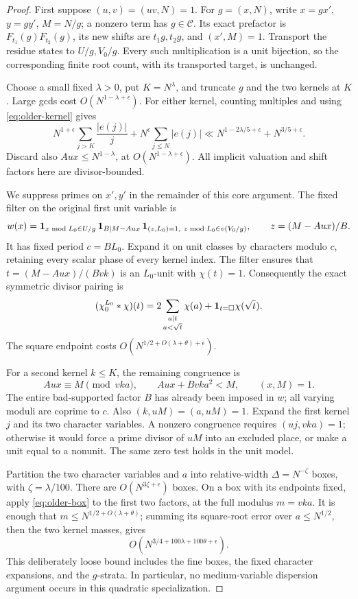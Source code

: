 \begin{proof}
First suppose \((u,v)=(uv,N)=1\).
For \(g=(x,N)\), write \(x=gx'\), \(y=gy'\), \(M=N/g\);
a nonzero term has \(g\in\mathcal C\).
Its exact prefactor is \(F_{t_1}(g)F_{t_2}(g)\), its new shifts
are \(t_1g,t_2g\), and \((x',M)=1\).
Transport the residue states to \(U/g,V_0/g\).
Every such multiplication is a unit bijection, so the corresponding
finite root count, with its transported target, is unchanged.

Choose a small fixed \(\lambda>0\), put \(K=N^\lambda\), and truncate
\(g\) and the two kernels at \(K\).
Large gcds cost \(O(N^{1-\lambda+\epsilon})\).
For either kernel, counting multiples and using
\eqref{eq:older-kernel} gives
\[
 N^{1+\epsilon}\sum_{j>K}\frac{|e(j)|}{j}
   +N^\epsilon\sum_{j\le N}|e(j)|
       \ll N^{1-2\lambda/5+\epsilon}+N^{3/5+\epsilon}.
\]
Discard also \(Au x\le N^{1-\lambda}\), at
\(O(N^{1-\lambda+\epsilon})\).
All implicit valuation and shift factors here are divisor-bounded.

We suppress primes on \(x',y'\) in the remainder of this core argument.
The fixed filter on the original first unit variable is
\[
 w(x)=\mathbf 1_{x\bmod L_0\in U/g}\,
       \mathbf 1_{B\mid M-Au x}\,
       \mathbf 1_{(z,L_0)=1,\ z\bmod L_0\in v(V_0/g)},\qquad
                       z=(M-Au x)/B.
\]
It has fixed period \(c=BL_0\).  Expand it on unit classes by characters
modulo \(c\), retaining every scalar phase of every kernel index.
The filter ensures that
\(t=(M-Au x)/(Bvk)\) is an \(L_0\)-unit with \(\chi(t)=1\).
Consequently the exact symmetric divisor pairing is
\[
 (\chi_0^{L_0}*\chi)(t)
  =2\sum_{\substack{a\mid t\\a<\sqrt t}}\chi(a)
                         +\mathbf 1_{t=\square}\chi(\sqrt t).
\]
The square endpoint costs \(O(N^{1/2+O(\lambda+\theta)+\epsilon})\).

For a second kernel \(k\le K\), the remaining congruence is
\[
       Au x\equiv M\pmod{vka},\qquad
       Au x+Bvka^2<M,\qquad (x,M)=1 .
\]
The entire bad-supported factor \(B\) has already been imposed in
\(w\); all varying moduli are coprime to \(c\).
Also \((k,uM)=(a,uM)=1\).
Expand the first kernel \(j\) and its two character variables.
A nonzero congruence requires \((uj,vka)=1\); otherwise it would
force a prime divisor of \(uM\) into an excluded place, or make a
unit equal to a nonunit.  The same zero test holds in the unit model.

Partition the two character variables and \(a\) into relative-width
\(\Delta=N^{-\zeta}\) boxes, with \(\zeta=\lambda/100\).
There are \(O(N^{3\zeta+\epsilon})\) boxes.
On a box with its endpoints fixed, apply \eqref{eq:older-box} to
the first two factors, at the full modulus \(m=vka\).
It is enough that \(m\le N^{1/2+O(\lambda+\theta)}\);
summing its square-root error over \(a\le N^{1/2}\),
then the two kernel masses, gives
\begin{equation}\label{eq:older-box-budget}
 O(N^{3/4+100\lambda+100\theta+\epsilon}).
\end{equation}
This deliberately loose bound includes the fine boxes, the fixed
character expansions, and the \(g\)-strata.
In particular, no medium-variable dispersion argument occurs
in this quadratic specialization.


\end{proof}
